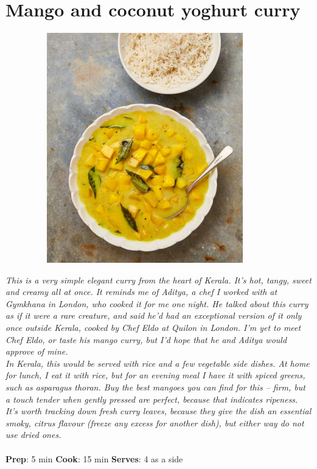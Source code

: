 \documentclass{book}
\begin{document}
\section{Mango and coconut yoghurt curry}
\begin{figure}
\centering\includegraphics[width=10cm,height=10cm,keepaspectratio]{Recipe_Pictures/Mango_and_coconut_yoghurt_curry.png}
\end{figure}
\emph{This is a very simple elegant curry from the heart of Kerala. It’s hot, tangy, sweet and creamy all at once. It reminds me of Aditya, a chef I worked with at Gymkhana in London, who cooked it for me one night. He talked about this curry as if it were a rare creature, and said he’d had an exceptional version of it only once outside Kerala, cooked by Chef Eldo at Quilon in London. I’m yet to meet Chef Eldo, or taste his mango curry, but I’d hope that he and Aditya would approve of mine.\\ 
In Kerala, this would be served with rice and a few vegetable side dishes. At home for lunch, I eat it with rice, but for an evening meal I have it with spiced greens, such as asparagus thoran. Buy the best mangoes you can find for this – firm, but a touch tender when gently pressed are perfect, because that indicates ripeness. It’s worth tracking down fresh curry leaves, because they give the dish an essential smoky, citrus flavour (freeze any excess for another dish), but either way do not use dried ones.}\\\\ 
\textbf{Prep}: 5 min
\textbf{Cook}: 15 min
\textbf{Serves}: 4 as a side
\end{document}
